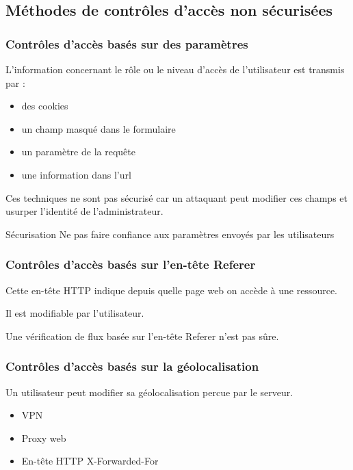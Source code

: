 \documentclass{beamer}
\begin{document}
\subsection{Méthodes de contrôles d'accès non sécurisées}

\begin{frame}
  \frametitle{Contrôles d'accès basés sur des paramètres}
  L'information concernant le rôle ou le niveau d'accès de l'utilisateur est transmis par :
  \begin{itemize}
    \item des cookies
    \item un champ masqué dans le formulaire
    \item un paramètre de la requête
    \item une information dans l'url
  \end{itemize}
  Ces techniques ne sont pas sécurisé car un attaquant peut modifier ces champs et usurper l'identité de l'administrateur.
  \begin{alertblock}{Sécurisation}
    Ne pas faire confiance aux paramètres envoyés par les utilisateurs
  \end{alertblock}
\end{frame}

\begin{frame}
  \frametitle{Contrôles d'accès basés sur l'en-tête Referer}
  Cette en-tête HTTP indique depuis quelle page web on accède à une ressource.
  \vspace{2em}
  
  Il est modifiable par l'utilisateur.
  \vspace{2em}
  
  Une vérification de flux basée sur l'en-tête Referer n'est pas sûre. 

\end{frame}

\begin{frame}
  \frametitle{Contrôles d'accès basés sur la géolocalisation}
  Un utilisateur peut modifier sa géolocalisation percue par le serveur.
  \begin{itemize}
    \item VPN
    \item Proxy web
    \item En-tête HTTP X-Forwarded-For
  \end{itemize}
\end{frame}
\end{document}
